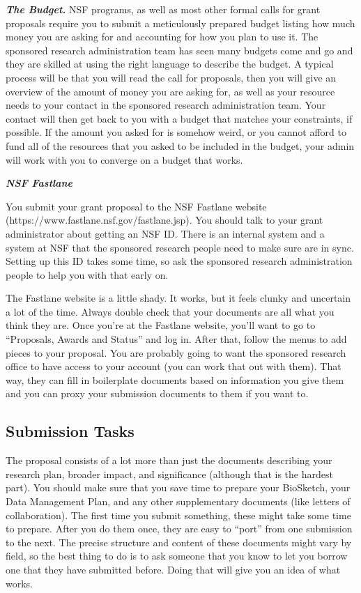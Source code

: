 {\noindent \em \bf The Budget.} NSF programs, as well as most other formal
calls for grant proposals require you to submit a meticulously prepared budget
listing how much money you are asking for and accounting for how you plan to
use it.  The sponsored research administration team has seen many budgets come
and go and they are skilled at using the right language to describe the budget.
A typical process will be that you will read the call for proposals, then you
will give an overview of the amount of money you are asking for, as well as
your resource needs to your contact in the sponsored research administration
team.  Your contact will then get back to you with a budget that matches your
constraints, if possible.  If the amount you asked for is somehow weird, or you
cannot afford to fund all of the resources that you asked to be included in the
budget, your admin will work with you to converge on a budget that works. 

{\noindent \em \bf NSF Fastlane}  

You submit your grant proposal to the NSF Fastlane website
(https://www.fastlane.nsf.gov/fastlane.jsp).   You should talk to your grant
administrator about getting an NSF ID.  There is an internal system and a
system at NSF that the sponsored research people need to make sure are in sync.
Setting up this ID takes some time, so ask the sponsored research
administration people to help you with that early on.

The Fastlane website is a little shady.  It works, but it feels clunky and
uncertain a lot of the time.  Always double check that your documents are all
what you think they are.  Once you're at the Fastlane website, you'll want to
go to ``Proposals, Awards and Status'' and log in.  After that, follow the
menus to add pieces to your proposal.  You are probably going to want the
sponsored research office to have access to your account (you can work that out
with them).  That way, they can fill in boilerplate documents based on
information you give them and you can proxy your submission documents to them
if you want to.  


\subsection{Submission Tasks}

The proposal consists of a lot more than just the documents describing your
research plan, broader impact, and significance (although that is the hardest
part).  You should make sure that you save time to prepare your BioSketch, your
Data Management Plan, and any other supplementary documents (like letters of
collaboration).  The first time you submit something, these might take some
time to prepare.  After you do them once, they are easy to ``port'' from one
submission to the next.  The precise structure and content of these documents
might vary by field, so the best thing to do is to ask someone that you know to
let you borrow one that they have submitted before.  Doing that will give you
an idea of what works.

